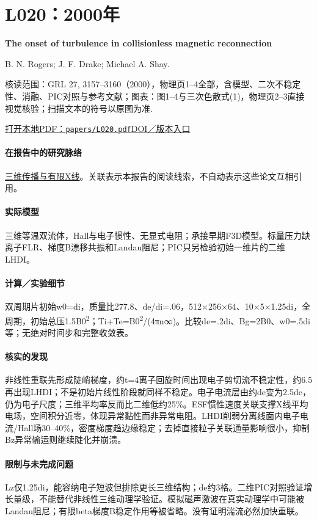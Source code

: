 \documentclass[UTF8,a4paper,11pt,openany,fontset=fandol]{ctexbook}
\begin{document}
\section{L020：2000年}\label{paper:L020}

\textbf{The onset of turbulence in collisionless magnetic reconnection}\citep{L020}\

B. N. Rogers;  J. F. Drake;  Michael A. Shay.

\textsf{核读范围：}GRL 27, 3157–3160（2000），物理页1–4全部，含模型、二次不稳定性、消融、PIC对照与参考文献；\textsf{图表：}图1–4与三次色散式(1)，物理页2–3直接视觉核验；扫描文本的符号以原图为准.

\href{run:../papers/L020.pdf}{打开本地PDF：\texttt{papers/L020.pdf}}\quad\href{https://doi.org/10.1029/2000gl000038}{DOI／版本入口}

\paragraph{在报告中的研究脉络}\hyperref[story:three]{三维传播与有限X线}。关联表示本报告的阅读线索，不自动表示这些论文互相引用。

\paragraph{实际模型}三维等温双流体，Hall与电子惯性、无显式电阻；承接早期F3D模型。标量压力缺离子FLR、梯度B漂移共振和Landau阻尼；PIC只另检验初始一维片的二维LHDI。

\paragraph{计算／实验细节}双周期片初始w0=di，质量比277.8、de/di=.06，512×256×64、10×5×1.25di，全周期，初始总压1.5B0\textsuperscript{2}；Ti+Te=B0\textsuperscript{2}/(4πn∞)。比较de=.2di、Bg=2B0、w0=.5di等；无绝对时间步和完整收敛表。

\paragraph{核实的发现}非线性重联先形成陡峭梯度，约t=4离子回旋时间出现电子剪切流不稳定性，约6.5再出现LHDI；不是初始片线性阶段就同样不稳定。电子电流层由约de变为2.5de，仍为电子尺度；三维平均率反而比二维低约25\%。ESF惯性速度关联支撑X线平均电场，空间积分近零，体现异常黏性而非异常电阻。LHDI削弱分离线面内电子电流/Hall场30–40\%，密度梯度趋边缘稳定；去掉直接粒子关联通量影响很小，抑制Bz异常输运则继续陡化并崩溃。

\paragraph{限制与未完成问题}Lz仅1.25di，能容纳电子短波但排除更长三维结构；de约3格。二维PIC对照验证增长量级，不能替代非线性三维动理学验证。模拟磁声激波在真实动理学中可能被Landau阻尼；有限beta梯度B稳定作用等被省略。没有证明湍流必然加快重联。
\end{document}
